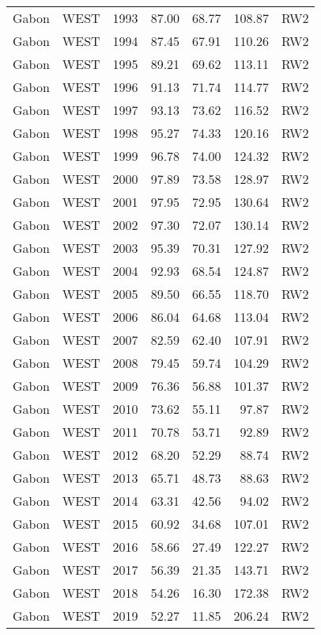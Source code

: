 \begin{longtable}{lllrrrl}
  Gabon & WEST & 1993 & 87.00 & 68.77 & 108.87 & RW2 \\ 
  Gabon & WEST & 1994 & 87.45 & 67.91 & 110.26 & RW2 \\ 
  Gabon & WEST & 1995 & 89.21 & 69.62 & 113.11 & RW2 \\ 
  Gabon & WEST & 1996 & 91.13 & 71.74 & 114.77 & RW2 \\ 
  Gabon & WEST & 1997 & 93.13 & 73.62 & 116.52 & RW2 \\ 
  Gabon & WEST & 1998 & 95.27 & 74.33 & 120.16 & RW2 \\ 
  Gabon & WEST & 1999 & 96.78 & 74.00 & 124.32 & RW2 \\ 
  Gabon & WEST & 2000 & 97.89 & 73.58 & 128.97 & RW2 \\ 
  Gabon & WEST & 2001 & 97.95 & 72.95 & 130.64 & RW2 \\ 
  Gabon & WEST & 2002 & 97.30 & 72.07 & 130.14 & RW2 \\ 
  Gabon & WEST & 2003 & 95.39 & 70.31 & 127.92 & RW2 \\ 
  Gabon & WEST & 2004 & 92.93 & 68.54 & 124.87 & RW2 \\ 
  Gabon & WEST & 2005 & 89.50 & 66.55 & 118.70 & RW2 \\ 
  Gabon & WEST & 2006 & 86.04 & 64.68 & 113.04 & RW2 \\ 
  Gabon & WEST & 2007 & 82.59 & 62.40 & 107.91 & RW2 \\ 
  Gabon & WEST & 2008 & 79.45 & 59.74 & 104.29 & RW2 \\ 
  Gabon & WEST & 2009 & 76.36 & 56.88 & 101.37 & RW2 \\ 
  Gabon & WEST & 2010 & 73.62 & 55.11 & 97.87 & RW2 \\ 
  Gabon & WEST & 2011 & 70.78 & 53.71 & 92.89 & RW2 \\ 
  Gabon & WEST & 2012 & 68.20 & 52.29 & 88.74 & RW2 \\ 
  Gabon & WEST & 2013 & 65.71 & 48.73 & 88.63 & RW2 \\ 
  Gabon & WEST & 2014 & 63.31 & 42.56 & 94.02 & RW2 \\ 
  Gabon & WEST & 2015 & 60.92 & 34.68 & 107.01 & RW2 \\ 
  Gabon & WEST & 2016 & 58.66 & 27.49 & 122.27 & RW2 \\ 
  Gabon & WEST & 2017 & 56.39 & 21.35 & 143.71 & RW2 \\ 
  Gabon & WEST & 2018 & 54.26 & 16.30 & 172.38 & RW2 \\ 
  Gabon & WEST & 2019 & 52.27 & 11.85 & 206.24 & RW2 \\ 

\end{longtable}
